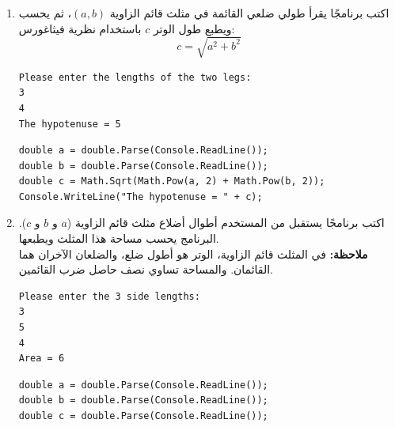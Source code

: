 \documentclass[14pt]{extarticle}
\begin{document}
\begin{enumerate}[itemsep=3em]
\begin{boxSolution}
\begin{english}
\begin{verbatim}
int fullClasses = students / 30;
int remaining = students % 30;

Console.WriteLine("Full classes: " + fullClasses);
Console.WriteLine("Remaining students: " + remaining);
    \end{verbatim}
    \end{english}
    \end{boxSolution}
    \fi
    \fi
    \clearpage

    \item
    اكتب برنامجًا يقرأ طولي ضلعي القائمة في مثلث قائم الزاوية $(a, b)$، ثم يحسب ويطبع طول الوتر $c$ باستخدام نظرية فيثاغورس:
    \[
        c = \sqrt{a^2 + b^2}
    \]
    \ifdetailed
    \begin{boxExample}
        \begin{english}
    \begin{verbatim}
Please enter the lengths of the two legs:
3
4
The hypotenuse = 5
    \end{verbatim}
\end{english}
\end{boxExample}
\ifwithsols
\begin{boxSolution}
    \begin{english}
        \begin{verbatim}
double a = double.Parse(Console.ReadLine());
double b = double.Parse(Console.ReadLine());
double c = Math.Sqrt(Math.Pow(a, 2) + Math.Pow(b, 2));
Console.WriteLine("The hypotenuse = " + c);
        \end{verbatim}
    \end{english}
\end{boxSolution}
\clearpage
\fi
\fi


    \item
    اكتب برنامجًا يستقبل من المستخدم أطوال أضلاع مثلث قائم الزاوية ($a$ و $b$ و $c$).
    البرنامج يحسب مساحة هذا المثلث ويطبعها. \\
    \textbf{ملاحظة:} في المثلث قائم الزاوية، الوتر هو أطول ضلع، والضلعان الآخران هما القائمان. والمساحة تساوي نصف حاصل ضرب القائمين.
    \ifdetailed
    \begin{boxExample}
    \begin{english}
    \begin{verbatim}
Please enter the 3 side lengths:
3
5
4
Area = 6
    \end{verbatim}
    \end{english}
    \end{boxExample}
    \ifwithsols
    \begin{boxSolution}
    \begin{english}
    \begin{verbatim}
double a = double.Parse(Console.ReadLine());
double b = double.Parse(Console.ReadLine());
double c = double.Parse(Console.ReadLine());


\end{verbatim}
\end{english}
\end{boxSolution}
\end{enumerate}
\end{document}
